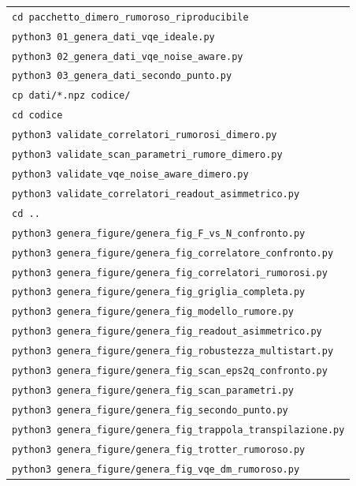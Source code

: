 \documentclass[11pt,a4paper]{article}
\newcommand{\code}[1]{\texttt{\small #1}}
\begin{document}
\begin{keyeq}
\centering
\begin{tabular}{@{}l@{}}
\code{cd pacchetto\_dimero\_rumoroso\_riproducibile}\\
\code{python3 01\_genera\_dati\_vqe\_ideale.py}\\
\code{python3 02\_genera\_dati\_vqe\_noise\_aware.py}\\
\code{python3 03\_genera\_dati\_secondo\_punto.py}\\
\code{cp dati/*.npz codice/}\\
\code{cd codice}\\
\code{python3 validate\_correlatori\_rumorosi\_dimero.py}\\
\code{python3 validate\_scan\_parametri\_rumore\_dimero.py}\\
\code{python3 validate\_vqe\_noise\_aware\_dimero.py}\\
\code{python3 validate\_correlatori\_readout\_asimmetrico.py}\\
\code{cd ..}\\
\code{python3 genera\_figure/genera\_fig\_F\_vs\_N\_confronto.py}\\
\code{python3 genera\_figure/genera\_fig\_correlatore\_confronto.py}\\
\code{python3 genera\_figure/genera\_fig\_correlatori\_rumorosi.py}\\
\code{python3 genera\_figure/genera\_fig\_griglia\_completa.py}\\
\code{python3 genera\_figure/genera\_fig\_modello\_rumore.py}\\
\code{python3 genera\_figure/genera\_fig\_readout\_asimmetrico.py}\\
\code{python3 genera\_figure/genera\_fig\_robustezza\_multistart.py}\\
\code{python3 genera\_figure/genera\_fig\_scan\_eps2q\_confronto.py}\\
\code{python3 genera\_figure/genera\_fig\_scan\_parametri.py}\\
\code{python3 genera\_figure/genera\_fig\_secondo\_punto.py}\\
\code{python3 genera\_figure/genera\_fig\_trappola\_transpilazione.py}\\
\code{python3 genera\_figure/genera\_fig\_trotter\_rumoroso.py}\\
\code{python3 genera\_figure/genera\_fig\_vqe\_dm\_rumoroso.py}\\
\end{tabular}
\end{keyeq}
\end{document}
